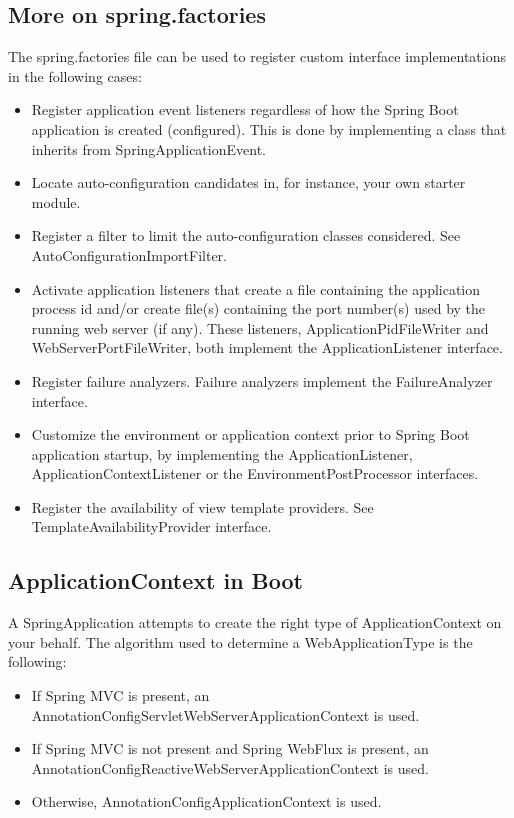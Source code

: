 \documentclass{scrartcl}
\begin{document}
\subsection{More on spring.factories}

The spring.factories file can be used to register custom interface implementations in the following cases:

\begin{itemize}
    \item Register application event listeners regardless of how the Spring Boot application is created (configured). This is done by implementing a class that inherits from SpringApplicationEvent.
    \item Locate auto-configuration candidates in, for instance, your own starter module.
    \item Register a filter to limit the auto-configuration classes considered. See AutoConfigurationImportFilter.
    \item  Activate application listeners that create a file containing the application process id and/or create file(s) containing the port number(s) used by the running web server (if any). These listeners, ApplicationPidFileWriter and WebServerPortFileWriter, both implement the ApplicationListener interface.
    \item Register failure analyzers. Failure analyzers implement the FailureAnalyzer interface.
    \item Customize the environment or application context prior to Spring Boot application startup, by implementing the ApplicationListener, ApplicationContextListener or the EnvironmentPostProcessor interfaces.
    \item Register the availability of view template providers. See TemplateAvailabilityProvider interface.
\end{itemize}
\subsection{ApplicationContext in Boot}

A SpringApplication attempts to create the right type of ApplicationContext on your behalf. The algorithm used to determine a WebApplicationType is the following:

\begin{itemize}
    \item If Spring MVC is present, an AnnotationConfigServletWebServerApplicationContext is used.
    \item If Spring MVC is not present and Spring WebFlux is present, an AnnotationConfigReactiveWebServerApplicationContext is used.
    \item Otherwise, AnnotationConfigApplicationContext is used.
\end{itemize}
\end{document}
